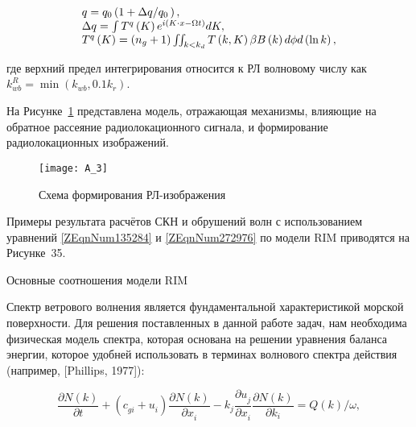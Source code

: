 \begin{equation} \label{1.45)} \begin{array}{l} {q=q_{0} \left(1+{\Delta q\mathord{\left/ {\vphantom {\Delta q q_{0} \, }} \right. \kern-\nulldelimiterspace} q_{0} \, } \right),} \\ {\Delta q=\int T^{q} \left(K\right)e^{i\left(K\cdot x-\Omega t\right)}  dK,} \\ {T^{q} \left(K\right)=\left(n_{g} +1\right)\iint \nolimits _{k<k_{d} }T\left(k,K\right)\beta B\left(k\right) d\phi d\left(\ln k\right),} \end{array} \end{equation}



\noindent где верхний предел интегрирования относится к РЛ волновому числу как $k_{wb}^{R} =\min \left(k_{wb} ,0.1k_{r} \right)$.

На Рисунке~\ref{fig:A.3} представлена модель, отражающая механизмы, влияющие на обратное рассеяние радиолокационного сигнала, и формирование радиолокационных изображений.



\begin{figure}[H]
    \texttt{[image: A\_3]}
    \caption{Схема формирования РЛ-изображения}
    \label{fig:A.3}
\end{figure}


Примеры результата расчётов СКН и обрушений волн с использованием уравнений \eqref{ZEqnNum135284} и \eqref{ZEqnNum272976} по модели RIM приводятся на Рисунке~35.






 Основные соотношения модели RIM

Спектр ветрового волнения является фундаментальной характеристикой морской поверхности. Для решения поставленных в данной работе задач, нам необходима физическая модель спектра, которая основана на решении уравнения баланса энергии, которое удобней использовать в терминах волнового спектра действия (например, [Phillips, 1977]):



\begin{equation} \label{1.29)} \frac{\partial N(k)}{\partial t} +\left(c_{gi}^{} +u_{i}^{} \right)\frac{\partial N(k)}{\partial x_{i}^{} } -k_{j}^{} \frac{\partial u_{j}^{} }{\partial x_{i}^{} } \frac{\partial N(k)}{\partial k_{i}^{} } =Q(k)/\omega , \end{equation} 



